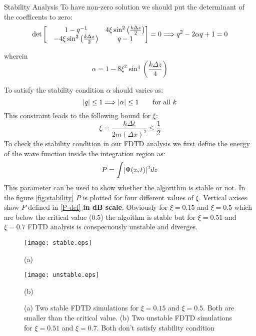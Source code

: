 \begin{homeworkProblem}
\begin{homeworkSection}{Stability Analysis}
 To have non-zero solution we should put the determinant of the coefficents to zero:
  \begin{equation}
  \det
  \begin{bmatrix}
  & 1-q^{-1} &  4\xi \sin^2\left(\frac{k\Delta z}{2}\right)\\
  &-4\xi \sin^2\left(\frac{k\Delta z}{2}\right) & q-1
  \end{bmatrix}
  =0\Longrightarrow q^2-2\alpha q+1=0
  \end{equation}  
 
 wherein 
 $$\alpha=1-8\xi^2\sin^{4}\left(\frac{k\Delta z}{4}\right)$$
 
To satisfy the stability condition $\alpha$ should varies as:
\begin{equation}
\lvert q\rvert\leq 1\Longrightarrow\lvert\alpha\rvert\leq 1\qquad \text{for all $k$}
\end{equation}
This constraint leads to the following bound for $\xi$:
\begin{equation}
\xi=\frac{\hbar\Delta t}{2m(\Delta x)^2}\leq \frac{1}{2}
\end{equation} 
To check the stability condition in our FDTD analysis we first define the energy of the wave function inside the integration region as:
\begin{equation}\label{P-def}
P=\int\lvert\Psi(z,t)\rvert^2dz
\end{equation} 
This parameter can be used to show whether the algorithm is stable or not. In the figure \eqref{fig:stability} $P$ is plotted for four different values of $\xi$. Vertical axises show $P$ defined in \eqref{P-def} \textbf{in dB scale}. Obviously for $\xi=0.15$ and $\xi=0.5$ which are below the critical value ($0.5$) the algoithm is stable but for $\xi=0.51$ and $\xi=0.7$ FDTD analysis is conspecuously unstable and diverges.

\begin{figure}[t]
\begin{minipage}[b]{1\linewidth}
\centering
\texttt{[image: stable.eps]}
\centerline{\small (a) }
\end{minipage}
\begin{minipage}[b]{1\linewidth}
\centering
\texttt{[image: unstable.eps]}
\centerline{\small (b) }
\end{minipage}
\caption { \small  (a) Two stable FDTD simulations for $\xi=0.15$ and $\xi=0.5$. Both are smaller than the critical value. (b) Two unstable FDTD simulations for $\xi=0.51$ and $\xi=0.7$. Both don't satisfy stability condition} 
\label{fig:stability}
\end{figure}


\end{homeworkSection}
\end{homeworkProblem}
